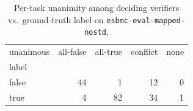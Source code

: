 \begin{table}[t]
  \centering
  \caption{Per-task unanimity among deciding verifiers vs.\ ground-truth label on \texttt{esbmc-eval-mapped-nostd}.}
  \label{tab:unanimous-esbmc-eval-mapped-nostd}
\begin{tabular}{lrrrr}
\toprule
unanimous & all-false & all-true & conflict & none \\
label &  &  &  &  \\
\midrule
false & 44 & 1 & 12 & 0 \\
true & 4 & 82 & 34 & 1 \\
\bottomrule
\end{tabular}
\end{table}
